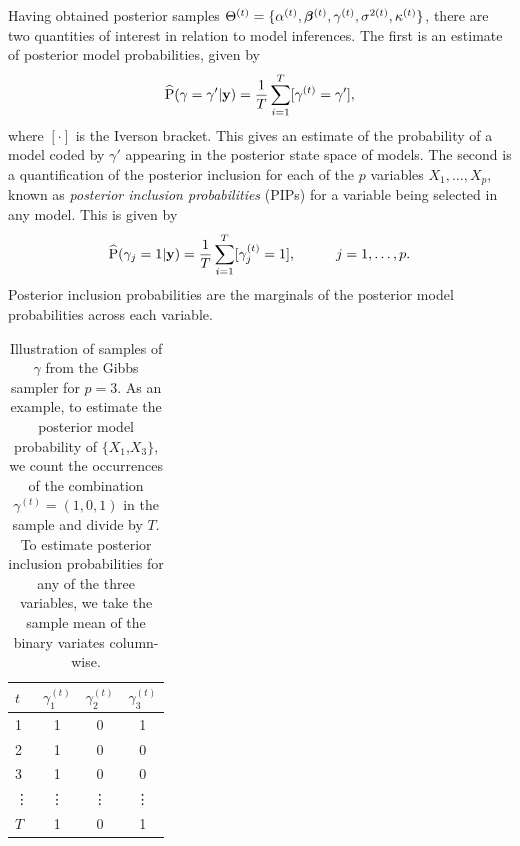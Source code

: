 \documentclass[showframe,11pt,twoside,openright]{report}
\begin{document}
Having obtained posterior samples $\Theta^{(t)}=\{\alpha^{(t)},{\bm\beta}^{(t)},\gamma^{(t)},\sigma^{2(t)},\kappa^{(t)} \}$, there are two quantities of interest in relation to model inferences. 
The first is an estimate of posterior model probabilities, given by
\begin{align}\label{eq:pmp-prop}
  \widehat {\operatorname{P}}(\gamma = \gamma' | {\mathbf y}) = \frac{1}{T}\sum_{i=1}^T [\gamma^{(t)} = \gamma'],
\end{align}
where $[\cdot]$ is the Iverson bracket.
This gives an estimate of the probability of a model coded by $\gamma'$ appearing in the posterior state space of models.
The second is a quantification of the posterior inclusion for each of the $p$ variables $X_1,\dots,X_p$, known as \emph{posterior inclusion probabilities} (PIPs) for a variable being selected in any model.
This is given by
\begin{align}\label{eq:pip-prop}
  \widehat {\operatorname{P}}(\gamma_j = 1 | {\mathbf y}) = \frac{1}{T}\sum_{i=1}^T [\gamma_j^{(t)} = 1], \hspace{1cm} j=1,\dots,p.
\end{align}
Posterior inclusion probabilities are the marginals of the posterior model probabilities across each variable.

\begin{table}[hbt]
  \centering  
  \caption[Illustration of samples of $\gamma$ from the Gibbs sampler]{Illustration of samples of $\gamma$ from the Gibbs sampler for $p=3$. As an example, to estimate the posterior model probability of $\{X_1$,$X_3\}$, we count the occurrences of the combination $\gamma^{(t)}=(1,0,1)$ in the sample and divide by $T$. To estimate posterior inclusion probabilities for any of the three variables, we take the sample mean of the binary variates column-wise.}
  \begin{tabular}{lccc}
    \toprule
    $t$ &$\gamma_1^{(t)}$ &$\gamma_2^{(t)}$ &$\gamma_3^{(t)}$ \\
    \midrule
    1  &1 &0 &1 \\
    2  &1 &0 &0 \\
    3  &1 &0 &0 \\
    \vdots &\vdots &\vdots &\vdots \\
    $T$  &1 &0 &1 \\
    \bottomrule
  \end{tabular}
\end{table}
\end{document}
